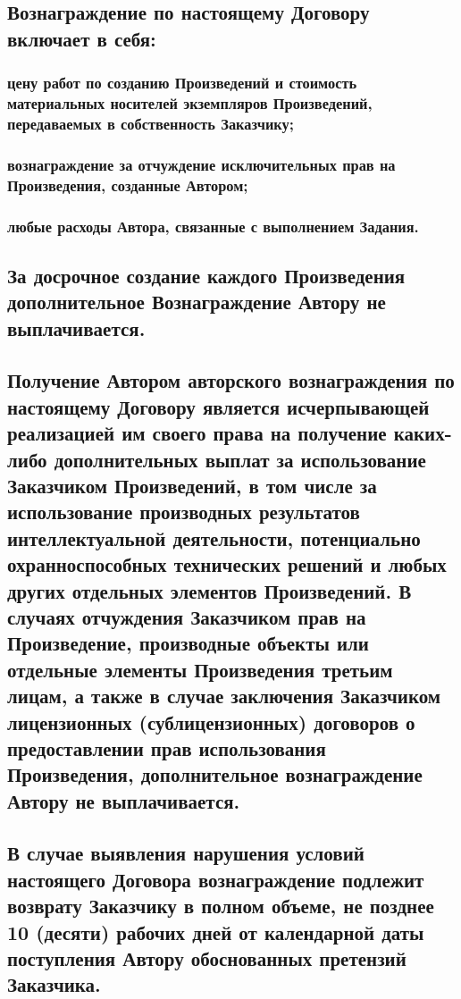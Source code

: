 \documentclass[12pt]{article}
\begin{document}
\subsection{Вознаграждение по настоящему Договору включает в себя:}

\subsubsection{цену работ по созданию Произведений и стоимость материальных носителей экземпляров Произведений, передаваемых в собственность Заказчику;}

\subsubsection{вознаграждение за отчуждение исключительных прав на Произведения, созданные Автором;}

\subsubsection{любые расходы Автора, связанные с выполнением Задания.}

\subsection{За досрочное создание каждого Произведения дополнительное Вознаграждение Автору не выплачивается.}

\subsection{Получение Автором авторского вознаграждения по настоящему Договору является исчерпывающей реализацией им своего права на получение каких-либо дополнительных выплат за использование Заказчиком Произведений, в том числе за использование производных результатов интеллектуальной деятельности, потенциально охранноспособных технических решений и любых других отдельных элементов Произведений. В случаях отчуждения Заказчиком прав на Произведение, производные объекты или отдельные элементы Произведения третьим лицам, а также в случае заключения Заказчиком лицензионных (сублицензионных) договоров о предоставлении прав использования Произведения, дополнительное вознаграждение Автору не выплачивается.}

\subsection{В случае выявления нарушения условий настоящего Договора вознаграждение подлежит возврату Заказчику в полном объеме, не позднее 10 (десяти) рабочих дней от календарной даты поступления Автору обоснованных претензий Заказчика.}
\end{document}

